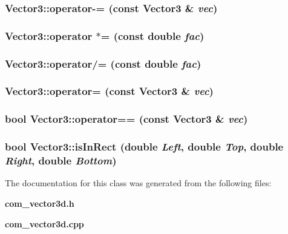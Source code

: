 \subsubsection{ Vector3::operator-= (const {\bf Vector3} \& {\em vec})}\label{classEngine_1_1Vector3_a9eae10eca2501a16de464421cd74a06}


\subsubsection{ Vector3::operator $\ast$= (const double {\em fac})}\label{classEngine_1_1Vector3_9fda8086d4be06cb141e9168880b2661}


\subsubsection{ Vector3::operator/= (const double {\em fac})}\label{classEngine_1_1Vector3_4c4e6908bf014b492af4b527b1336748}


\subsubsection{ Vector3::operator= (const {\bf Vector3} \& {\em vec})}\label{classEngine_1_1Vector3_86adbe399a5c4d15294ef9eb1731e978}


\subsubsection{\setlength{\rightskip}{0pt plus 5cm}bool Vector3::operator== (const {\bf Vector3} \& {\em vec})}\label{classEngine_1_1Vector3_d3b60ce19f9c98b5ada5ef5540aa4272}


\subsubsection{\setlength{\rightskip}{0pt plus 5cm}bool Vector3::isInRect (double {\em Left}, double {\em Top}, double {\em Right}, double {\em Bottom})}\label{classEngine_1_1Vector3_4f4b8d61869384c1f2d787b8fd7faa20}




The documentation for this class was generated from the following files:\begin{CompactItemize}
\item 
{\bf com\_\-vector3d.h}\item 
{\bf com\_\-vector3d.cpp}\end{CompactItemize}
